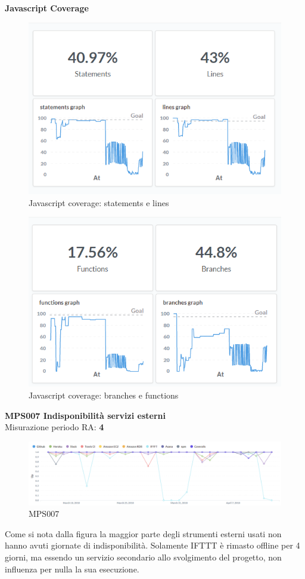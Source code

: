\documentclass[PianoDiQualifica.tex]{subfiles}
\begin{document}
\newpage
\textbf{Javascript Coverage}\\
\begin{figure}[H]
	\centering
	\includegraphics[width=0.7\linewidth]{RQ/JsCoverage1}
	\caption{Javascript coverage: statements e lines}
	\label{fig:processi}
\end{figure}
\begin{figure}[H]
	\centering
	\includegraphics[width=0.7\linewidth]{RQ/JsCoverage2}
	\caption{Javascript coverage: branches e functions}
	\label{fig:processi}
\end{figure}
\newpage
\textbf{MPS007 Indisponibilità servizi esterni}\\
Misurazione periodo RA: \textbf{4}
\begin{figure}[H]
	\centering
	\includegraphics[width=1\linewidth]{RQ/MPS007}
	\caption{MPS007}
	\label{fig:processi}
\end{figure}
Come si nota dalla figura la maggior parte degli strumenti esterni usati non hanno avuti giornate di indisponibilità.
Solamente IFTTT è rimasto offline per 4 giorni, ma essendo un servizio secondario allo svolgimento del progetto, non influenza per nulla la sua esecuzione. \\
\end{document}
